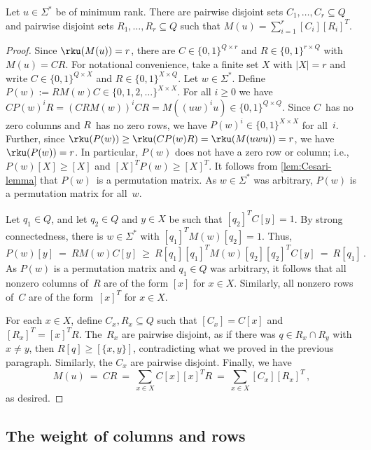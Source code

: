 \begin{prop} \label{prop:Cesari-first}
Let $u \in \Sigma^*$ be of minimum rank.
There are pairwise disjoint sets $C_1, \ldots, C_r \subseteq Q$ and pairwise disjoint sets $R_1, \ldots, R_r \subseteq Q$ such that $M(u) = \sum_{i=1}^r [C_i] [R_i]^T$.
\end{prop}
\begin{proof}
Since $\rku(M(u)) = r$, there are $C \in \{0,1\}^{Q \times r}$ and $R \in \{0,1\}^{r \times Q}$ with $M(u) = C R$.
For notational convenience, take a finite set $X$ with $|X| = r$ and write $C \in \{0,1\}^{Q \times X}$ and $R \in \{0,1\}^{X \times Q}$.
Let $w \in \Sigma^*$.
Define $P(w) := R M(w) C \in \{0,1,2,\ldots\}^{X \times X}$.
For all $i \ge 0$ we have $C P(w)^i R = (C R M(w))^i C R = M((u w)^i u) \in \{0,1\}^{Q \times Q}$.
Since $C$~has no zero columns and $R$~has no zero rows, we have $P(w)^i \in \{0,1\}^{X \times X}$ for all~$i$.
Further, since $\rku(P(w)) \ge \rku(C P(w) R) = \rku(M(u w u)) = r$, we have $\rku(P(w)) = r$.
In particular, $P(w)$ does not have a zero row or column; i.e., $P(w) [X] \ge [X]$ and $[X]^T P(w) \ge [X]^T$. 
It follows from \autoref{lem:Cesari-lemma} that $P(w)$~is a permutation matrix.
As $w \in \Sigma^*$ was arbitrary, $P(w)$ is a permutation matrix for all~$w$.

Let $q_1 \in Q$, and let $q_2 \in Q$ and $y \in X$ be such that $[q_2]^T C [y] = 1$.
By strong connectedness, there is $w \in \Sigma^*$ with $[q_1]^T M(w) [q_2] = 1$.
Thus,
\[
P(w) [y] \ = \ R M(w) C [y] \ \ge \ R [q_1] [q_1]^T M(w) [q_2] [q_2]^T C [y] \ = \ R [q_1] \,.
\]
As $P(w)$ is a permutation matrix and $q_1 \in Q$ was arbitrary, it follows that all nonzero columns of~$R$ are of the form $[x]$ for $x \in X$.
Similarly, all nonzero rows of~$C$ are of the form~$[x]^T$ for $x \in X$.

For each $x \in X$, define $C_x, R_x \subseteq Q$ such that $[C_x] = C [x]$ and $[R_x]^T = [x]^T R$.
The~$R_x$ are pairwise disjoint, as if there was $q \in R_x \cap R_y$ with $x \ne y$, then $R [q] \ge [\{x,y\}]$, contradicting what we proved in the previous paragraph.
Similarly, the $C_x$ are pairwise disjoint.
Finally, we have
\[
 M(u) \ = \ C R \ = \ \sum_{x \in X} C [x] [x]^T R \ = \ \sum_{x \in X} [C_x] [R_x]^T\,,
\]
as desired.
\end{proof}


\subsection{The weight of columns and rows}\label{subsec:weights}

